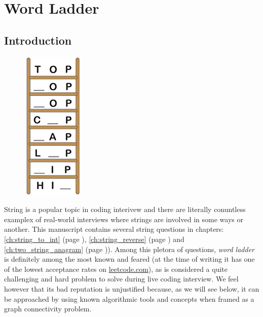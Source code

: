 %



\chapter{Word Ladder}
\label{ch:word_ladder}
\section*{Introduction}
\begin{figure}
    \vspace{-30pt}
    \begin{center}
        \includegraphics[scale=0.5]{sources/word_ladder/images/top-word-ladder}
    \end{center}
  \end{figure}
String is a popular topic in coding interivew and there are literally conuntless examplex of real-world interviews where strings are involved in some ways or another.
This manuscript contains several string questions in chapters: \ref{ch:string_to_int} (page \pageref{ch:string_to_int}), \ref{ch:string_reverse} (page \pageref{ch:string_reverse}) and \ref{ch:two_string_anagram} (page \pageref{ch:two_string_anagram})).
Among this pletora of questions, \textit{word ladder} is definitely among the most known and feared (at the time of writing it has one of the lowest acceptance rates on \href{https://leetcode.com/problems/word-ladder/}{leetcode.com}), as is considered a quite challenging and hard problem to solve during live coding interview. 
We feel however that its bad reputation is unjustified because, as we will see below, it can be approached by using known algorithmic tools and concepts when framed as a graph connectivity problem.


